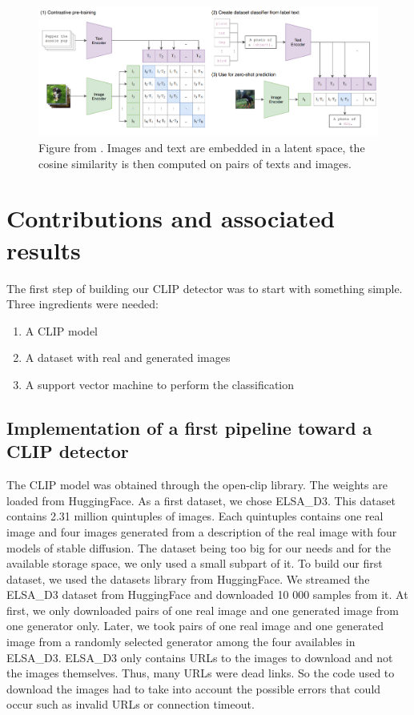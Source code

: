 \documentclass[12pt,a4paper]{article}
\begin{document}
\begin{figure}[H]
    \includegraphics*[width=\textwidth]{img/CLIP.png}
    \caption{Figure from \autocite*{radfordLearningTransferableVisual2021}. Images and text are embedded in a latent space, the cosine similarity is then computed on pairs of texts and images.}
\end{figure}

\section{Contributions and associated results}
The first step of building our CLIP detector was to start with something simple. Three ingredients were needed:
\begin{enumerate}
    \item A CLIP model
    \item A dataset with real and generated images
    \item A support vector machine to perform the classification
\end{enumerate}

\subsection{Implementation of a first pipeline toward a CLIP detector}
The CLIP model was obtained through the open-clip library. The weights are loaded from HuggingFace. As a first dataset, we chose ELSA\_D3. This dataset contains 2.31 million quintuples of images. Each quintuples contains one real image and four images generated from a description of the real image with four models of stable diffusion. The dataset being too big for our needs and for the available storage space, we only used a small subpart of it. To build our first dataset, we used the datasets library from HuggingFace. We streamed the ELSA\_D3 dataset from HuggingFace and downloaded 10 000 samples from it. At first, we only downloaded pairs of one real image and one generated image from one generator only. Later, we took pairs of one real image and one generated image from a randomly selected generator among the four availables in ELSA\_D3. ELSA\_D3 only contains URLs to the images to download and not the images themselves. Thus, many URLs were dead links. So the code used to download the images had to take into account the possible errors that could occur such as invalid URLs or connection timeout. 
\end{document}
